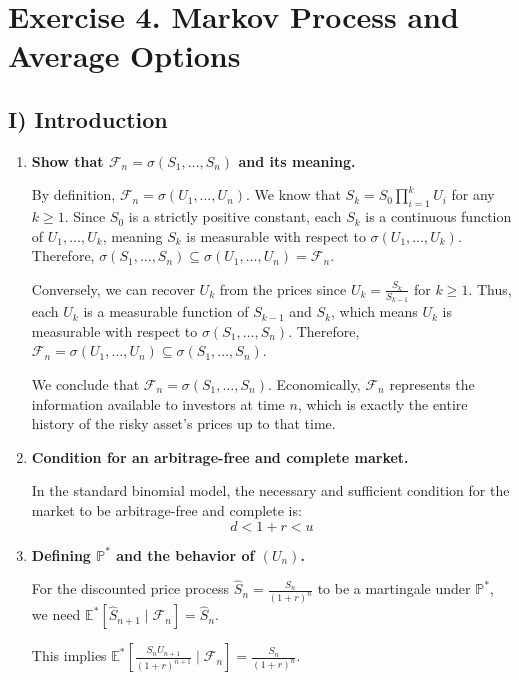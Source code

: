 \section{Exercise 4. Markov Process and Average Options}

\subsection{I) Introduction}

\begin{enumerate}
      \item \textbf{Show that $\mathcal{F}_n = \sigma(S_1, \dots, S_n)$ and its meaning.}

            By definition, $\mathcal{F}_n = \sigma(U_1, \dots, U_n)$.
            We know that $S_k = S_0 \prod_{i=1}^k U_i$ for any $k \ge 1$. Since $S_0$ is a strictly positive constant, each $S_k$ is a continuous function of $U_1, \dots, U_k$, meaning $S_k$ is measurable with respect to $\sigma(U_1, \dots, U_k)$. Therefore, $\sigma(S_1, \dots, S_n) \subseteq \sigma(U_1, \dots, U_n) = \mathcal{F}_n$.

            Conversely, we can recover $U_k$ from the prices since $U_k = \frac{S_k}{S_{k-1}}$ for $k \ge 1$. Thus, each $U_k$ is a measurable function of $S_{k-1}$ and $S_k$, which means $U_k$ is measurable with respect to $\sigma(S_1, \dots, S_n)$. Therefore, $\mathcal{F}_n = \sigma(U_1, \dots, U_n) \subseteq \sigma(S_1, \dots, S_n)$.

            We conclude that $\mathcal{F}_n = \sigma(S_1, \dots, S_n)$. Economically, $\mathcal{F}_n$ represents the information available to investors at time $n$, which is exactly the entire history of the risky asset's prices up to that time.

      \item \textbf{Condition for an arbitrage-free and complete market.}

            In the standard binomial model, the necessary and sufficient condition for the market to be arbitrage-free and complete is:
            \[ d < 1+r < u \]

      \item \textbf{Defining $\mathbb{P}^*$ and the behavior of $(U_n)$.}

            For the discounted price process $\hat{S}_n = \frac{S_n}{(1+r)^n}$ to be a martingale under $\mathbb{P}^*$, we need $\mathbb{E}^*[\hat{S}_{n+1} \mid \mathcal{F}_n] = \hat{S}_n$.

            This implies $\mathbb{E}^*\left[ \frac{S_n U_{n+1}}{(1+r)^{n+1}} \mid \mathcal{F}_n \right] = \frac{S_n}{(1+r)^n}$.


\end{enumerate}
